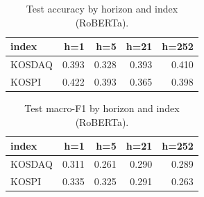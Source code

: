 \begin{table}[t]\centering
\caption{Test accuracy by horizon and index (RoBERTa).}
\begin{tabular}{lrrrr}
\toprule
index & h=1 & h=5 & h=21 & h=252 \\
\midrule
KOSDAQ & 0.393 & 0.328 & 0.393 & 0.410 \\
KOSPI & 0.422 & 0.393 & 0.365 & 0.398 \\
\bottomrule
\end{tabular}
\end{table}

\begin{table}[t]\centering
\caption{Test macro-F1 by horizon and index (RoBERTa).}
\begin{tabular}{lrrrr}
\toprule
index & h=1 & h=5 & h=21 & h=252 \\
\midrule
KOSDAQ & 0.311 & 0.261 & 0.290 & 0.289 \\
KOSPI & 0.335 & 0.325 & 0.291 & 0.263 \\
\bottomrule
\end{tabular}
\end{table}